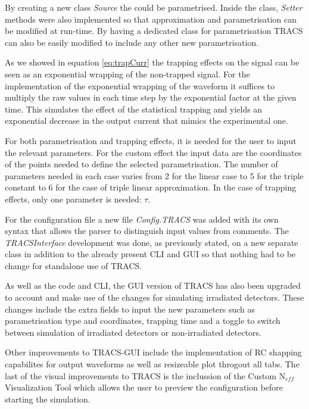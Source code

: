 By creating a new class \textit{Source} the \neff could be parametrised. Inside the class, \emph{Setter} methods were also implemented so that \neff approximation and parametrisation can be modified at run-time. By having a dedicated class for \neff parametrisation TRACS can also be easily modified to include any other new parametrisation. 

As we showed in equation \ref{eq:trapCurr} the trapping effects on the signal can be seen as an exponential wrapping of the non-trapped signal. For the implementation of the exponential wrapping of the waveform it suffices to multiply the raw values in each time step by the exponential factor at the given time. This simulates the effect of the statistical trapping and yields an exponential decrease in the output current that mimics the experimental one.

For both \neff parametrisation and trapping effects, it is needed for the user to input the relevant parameters. For the custom \neff effect the input data are the coordinates of the points needed to define the selected \neff parametrisation. The number of parameters needed in each case varies from 2 for the linear case to 5 for the triple constant \neff to 6 for the case of triple linear approximation. In the case of trapping effects, only one parameter is needed: $ \tau $.

For the configuration file a new file \textit{Config.TRACS} was added with its own syntax that allows the parser to distinguish input values from comments. The \textit{TRACSInterface} development was done, as previously stated, on a new separate class in addition to the already present CLI and GUI so that nothing had to be change for standalone use of TRACS.

As well as the code and CLI, the GUI version of TRACS has also been upgraded to account and make use of the changes for simulating irradiated detectors. These changes include the extra fields to input the new parameters such as \neff parametrisation type and coordinates, trapping time and a toggle to switch between simulation of irradiated detectors or non-irradiated detectors. 

Other improvements to TRACS-GUI include the implementation of RC shapping capabilites for output waveforms as well as resizeable plot throgout all tabs. The last of the visual improvements to TRACS is the inclussion of the Custom N$_{eff}$ Visualization Tool which allows the user to preview the \neff configuration before starting the simulation.


